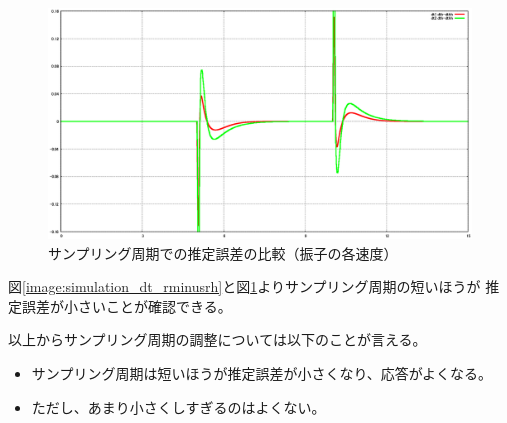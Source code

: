 	\begin{figure}[H]
		\centering
		\includegraphics[width=0.8\linewidth]{gazo/simulation_dt_compare_THETAminusTHETAH.eps}
		\caption{サンプリング周期での推定誤差の比較（振子の各速度）}
		\label{image:simulation_dt_thetaminusthetah}
	\end{figure}
	図\ref{image:simulation_dt_rminusrh}と図\ref{image:simulation_dt_thetaminusthetah}よりサンプリング周期の短いほうが
	推定誤差が小さいことが確認できる。
	\par
	以上からサンプリング周期の調整については以下のことが言える。
	\begin{itemize}
	  \item サンプリング周期は短いほうが推定誤差が小さくなり、応答がよくなる。
	  \item ただし、あまり小さくしすぎるのはよくない。
	\end{itemize}
	

